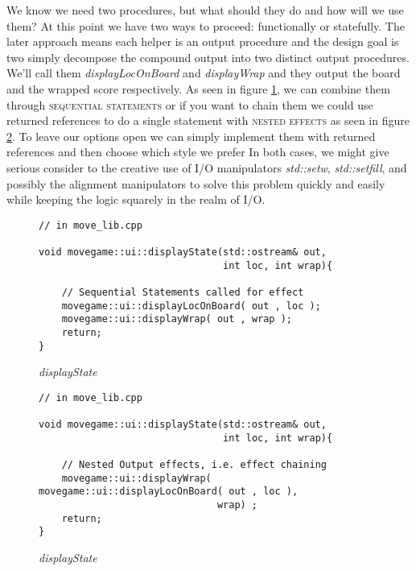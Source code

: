 \documentclass[nobib]{tufte-handout}
\begin{document}
We know we need two procedures, but what should they do and how will we use them?  At this point we have two ways to proceed: functionally or statefully. The later approach means each helper is an output procedure and the design goal is two simply decompose the compound output into two distinct output procedures. We'll call them \textit{displayLocOnBoard} and \textit{displayWrap} and they output the board and the wrapped score respectively. As seen in figure \ref{fig:display-twoOut}, we can combine them through \textsc{sequential statements} or if you want to chain them we could use returned references to do a single statement with \textsc{nested effects} as seen in figure \ref{fig:display-twoOut-chained}. To leave our options open we can simply implement them with returned references and then choose which style we prefer In both cases, we might give serious consider to the creative use of I/O manipulators \textit{std::setw}, \textit{std::setfill}, and possibly the alignment manipulators to solve this problem quickly and easily while keeping the logic squarely in the realm of I/O. 
 
\begin{figure}[!htbp]
\begin{lstlisting}
// in move_lib.cpp

void movegame::ui::displayState(std::ostream& out,
	                            int loc, int wrap){

	// Sequential Statements called for effect
	movegame::ui::displayLocOnBoard( out , loc );                            
	movegame::ui::displayWrap( out , wrap );
	return;	                            
}	       

\end{lstlisting}
\caption{\textit{displayState} }
\label{fig:display-twoOut}
\end{figure}

\begin{figure}[!htbp]
\begin{lstlisting}
// in move_lib.cpp

void movegame::ui::displayState(std::ostream& out,
	                            int loc, int wrap){

	// Nested Output effects, i.e. effect chaining
	movegame::ui::displayWrap( movegame::ui::displayLocOnBoard( out , loc ),
							   wrap) ;                            
	return;	                            
}	       

\end{lstlisting}
\caption{\textit{displayState} }
\label{fig:display-twoOut-chained}
\end{figure}
\end{document}

